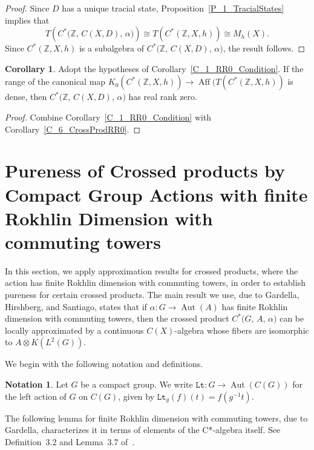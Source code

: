 \documentclass[10pt]{amsart}
\numberwithin{equation}{section}
\theoremstyle{definition}
\newtheorem{cor}[thm]{Corollary}
\newtheorem{ntn}[thm]{Notation}
\newcommand{\af}{\alpha}
\newcommand{\Z}{{\mathbb{Z}}}
\newcommand{\Aut}{{\operatorname{Aut}}}
\newcommand{\Aff}{{\operatorname{Aff}}}
\begin{document}
\begin{proof}
Since $D$ has a unique tracial state,
Proposition~\ref{P_1_TracialStates} implies that
%
\[
T( C^* \bigl( \Z, \, C (X, D), \, \af \bigr) ) \cong
T ( C^* ( \Z, X, h ) ) \cong M_{h} (X).
\]
%
Since
$C^* ( \Z, X, h )$ is a subalgebra of
$C^* \bigl( \Z, \, C (X, D), \, \af \bigr)$, the result
follows.
\end{proof}

\begin{cor}\label{C_6327_RRZ}
Adopt the hypotheses of Corollary~\ref{C_1_RR0_Condition}.
If the range of the canonical map
$K_{0} ( C^* ( \Z, X, h ) ) \to \Aff (T ( C^* ( \Z, X, h ) )$
is dense, then
$C^* \bigl( \Z, \, C (X, D), \, \af \bigr)$ has real rank zero.
\end{cor}

\begin{proof}
Combine Corollary~\ref{C_1_RR0_Condition}
with Corollary~\ref{C_6_CrossProdRR0}.
\end{proof}

\section{Pureness of Crossed products by Compact Group Actions with
 finite Rokhlin Dimension with commuting towers}\label{Sec_6326_FinRD}

In this section, we apply approximation results for crossed products,
where the action has finite Rokhlin dimension with commuting towers,
in order to establish pureness for certain crossed products.
The main result we use, due to Gardella, Hirshberg, and Santiago,
states that if $\alpha \colon G \to \Aut(A)$
has finite Rokhlin dimension with commuting towers,
then the crossed product $C^* \bigl( G, \, A, \, \af \bigr)$
can be locally approximated by a continuous $C (X)$-algebra
whose fibers are isomorphic to $A \otimes K(L^2 (G))$.

We begin with the following notation and definitions.

\begin{ntn}\label{N_6326_TrA}
Let $G$ be a compact group.
We write $\mathtt{Lt} \colon G \to \Aut (C (G))$
for the left action of $G$ on $C (G)$,
given by $\mathtt{Lt}_g (f) (t) = f (g^{-1} t)$.
\end{ntn}

The following lemma for finite Rokhlin dimension with commuting towers,
due to Gardella,
characterizes it in terms of elements of the C*-algebra itself.
See Definition~3.2 and Lemma~3.7 of~\cite{gardella17}.
\end{document}
